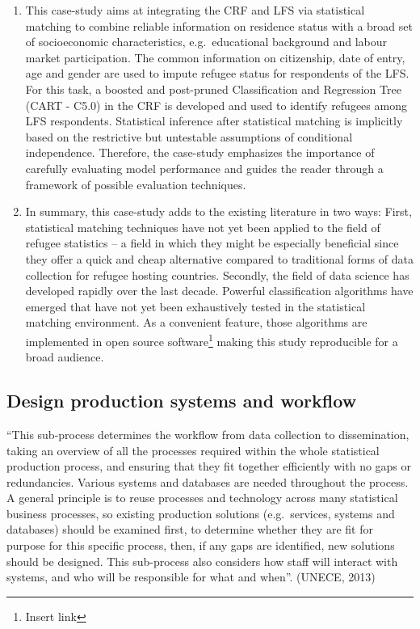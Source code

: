 \documentclass[
]{article}
\begin{document}
\begin{enumerate}
\def\labelenumi{\arabic{enumi}.}
\setcounter{enumi}{265}
\item
  This case-study aims at integrating the CRF and LFS via statistical
  matching to combine reliable information on residence status with a
  broad set of socioeconomic characteristics, e.g.~educational
  background and labour market participation. The common information
  on citizenship, date of entry, age and gender are used to impute
  refugee status for respondents of the LFS. For this task, a boosted
  and post-pruned Classification and Regression Tree (CART - C5.0) in
  the CRF is developed and used to identify refugees among LFS
  respondents. Statistical inference after statistical matching is
  implicitly based on the restrictive but untestable assumptions of
  conditional independence. Therefore, the case-study emphasizes the
  importance of carefully evaluating model performance and guides the
  reader through a framework of possible evaluation techniques.
\item
  In summary, this case-study adds to the existing literature in two
  ways: First, statistical matching techniques have not yet been
  applied to the field of refugee statistics -- a field in which they
  might be especially beneficial since they offer a quick and cheap
  alternative compared to traditional forms of data collection for
  refugee hosting countries. Secondly, the field of data science has
  developed rapidly over the last decade. Powerful classification
  algorithms have emerged that have not yet been exhaustively tested
  in the statistical matching environment. As a convenient feature,
  those algorithms are implemented in open source software\footnote{Insert link} making
  this study reproducible for a broad audience.
\end{enumerate}

\hypertarget{design-production-systems-and-workflow}{%
\subsection{Design production systems and workflow}\label{design-production-systems-and-workflow}}

``This sub-process determines the workflow from data collection to
dissemination, taking an overview of all the processes required within
the whole statistical production process, and ensuring that they fit
together efficiently with no gaps or redundancies. Various systems and
databases are needed throughout the process. A general principle is to
reuse processes and technology across many statistical business
processes, so existing production solutions (e.g.~services, systems and
databases) should be examined first, to determine whether they are fit
for purpose for this specific process, then, if any gaps are identified,
new solutions should be designed. This sub-process also considers how
staff will interact with systems, and who will be responsible for what
and when''. (UNECE, 2013)
\end{document}

